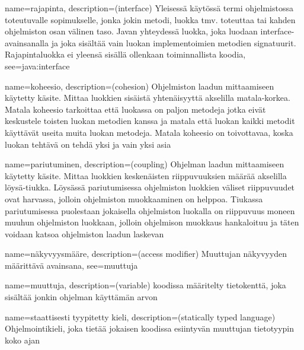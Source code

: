{
    name=rajapinta,
    description={(interface) Yleisessä käytössä termi ohjelmistossa toteutuvalle sopimukselle,
jonka jokin metodi, luokka tmv. toteuttaa tai kahden ohjelmiston osan välinen taso. Javan
yhteydessä luokka, joka luodaan interface-avainsanalla ja joka sisältää vain
luokan implementoimien metodien signatuurit. Rajapintaluokka ei yleensä sisällä ollenkaan
toiminnallista koodia},
    see={java:interface}
}

{
    name=koheesio,
    description={(cohesion) Ohjelmiston laadun mittaamiseen käytetty käsite.
Mittaa luokkien sisäistä yhtenäisyyttä akselilla matala-korkea. Matala koheesio
tarkoittaa että luokassa on paljon metodeja jotka eivät keskustele toisten
luokan metodien kanssa ja matala että luokan kaikki metodit käyttävät useita
muita luokan metodeja. Matala koheesio on toivottavaa, koska luokan tehtävä
on tehdä yksi ja vain yksi asia}
}

{
    name=pariutuminen,
    description={(coupling) Ohjelman laadun mittaamiseen käytetty käsite.
Mittaa luokkien keskenäisten riippuvuuksien määrää akselilla löysä-tiukka.
Löysässä pariutumisessa ohjelmiston luokkien väliset riippuvuudet ovat
harvassa, jolloin ohjelmiston muokkaaminen on helppoa. Tiukassa pariutumisessa
puolestaan jokaisella ohjelmiston luokalla on riippuvuus moneen muuhun
ohjelmiston luokkaan, jolloin ohjelmison muokkaus hankaloituu ja täten voidaan
katsoa ohjelmiston laadun laskevan}
}


{
    name=näkyvyysmääre,
    description={(access modifier) Muuttujan näkyvyyden määrittävä avainsana},
    see=muuttuja
}

{
    name=muuttuja,
    description={(variable) koodissa määritelty tietokenttä, joka sisältää jonkin ohjelman
käyttämän arvon}
}

{
    name=staattisesti tyypitetty kieli,
    description={(statically typed language) Ohjelmointikieli, joka tietää jokaisen koodissa
esiintyvän muuttujan tietotyypin koko ajan}
}

